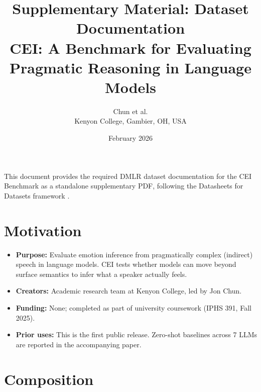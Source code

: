 \documentclass[11pt]{article}
\title{Supplementary Material: Dataset Documentation\\[0.5em]
\large CEI: A Benchmark for Evaluating Pragmatic Reasoning in Language Models}
\author{Chun et al.\\Kenyon College, Gambier, OH, USA}
\date{February 2026}
\begin{document}
\maketitle

\noindent This document provides the required DMLR dataset documentation for the CEI Benchmark as a standalone supplementary PDF, following the Datasheets for Datasets framework \cite{gebru2021datasheets}.

\section{Motivation}

\begin{itemize}[leftmargin=*]
    \item \textbf{Purpose:} Evaluate emotion inference from pragmatically complex (indirect) speech in language models. CEI tests whether models can move beyond surface semantics to infer what a speaker actually feels.
    \item \textbf{Creators:} Academic research team at Kenyon College, led by Jon Chun.
    \item \textbf{Funding:} None; completed as part of university coursework (IPHS 391, Fall 2025).
    \item \textbf{Prior uses:} This is the first public release. Zero-shot baselines across 7 LLMs are reported in the accompanying paper.
\end{itemize}

\section{Composition}
\end{document}
